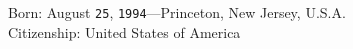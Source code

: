 \documentclass[11pt, letterpaper]{article}
\newcommand*{\img}[1]{%
    \raisebox{-.3\baselineskip}{%
        \texttt{[image: \#1]}%
    }%
}
\begin{document}


Born:  August \texttt{25}, \texttt{1994}---Princeton, New Jersey, U.S.A.\\
Citizenship:  United States of America
\end{document}
